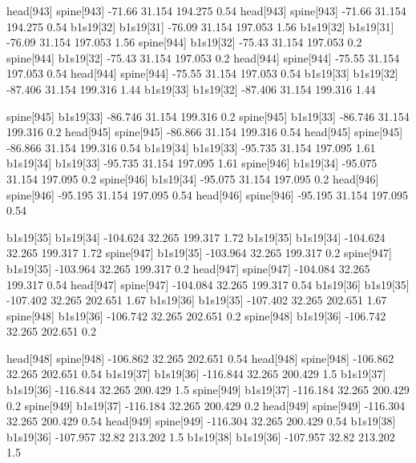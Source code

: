 head[943]    spine[943]    -71.66    31.154    194.275    0.54
head[943]    spine[943]    -71.66    31.154    194.275    0.54
b1s19[32]    b1s19[31]    -76.09    31.154    197.053    1.56
b1s19[32]    b1s19[31]    -76.09    31.154    197.053    1.56
spine[944]    b1s19[32]    -75.43    31.154    197.053    0.2
spine[944]    b1s19[32]    -75.43    31.154    197.053    0.2
head[944]    spine[944]    -75.55    31.154    197.053    0.54
head[944]    spine[944]    -75.55    31.154    197.053    0.54
b1s19[33]    b1s19[32]    -87.406    31.154    199.316    1.44
b1s19[33]    b1s19[32]    -87.406    31.154    199.316    1.44


spine[945]    b1s19[33]    -86.746    31.154    199.316    0.2
spine[945]    b1s19[33]    -86.746    31.154    199.316    0.2
head[945]    spine[945]    -86.866    31.154    199.316    0.54
head[945]    spine[945]    -86.866    31.154    199.316    0.54
b1s19[34]    b1s19[33]    -95.735    31.154    197.095    1.61
b1s19[34]    b1s19[33]    -95.735    31.154    197.095    1.61
spine[946]    b1s19[34]    -95.075    31.154    197.095    0.2
spine[946]    b1s19[34]    -95.075    31.154    197.095    0.2
head[946]    spine[946]    -95.195    31.154    197.095    0.54
head[946]    spine[946]    -95.195    31.154    197.095    0.54


b1s19[35]    b1s19[34]    -104.624    32.265    199.317    1.72
b1s19[35]    b1s19[34]    -104.624    32.265    199.317    1.72
spine[947]    b1s19[35]    -103.964    32.265    199.317    0.2
spine[947]    b1s19[35]    -103.964    32.265    199.317    0.2
head[947]    spine[947]    -104.084    32.265    199.317    0.54
head[947]    spine[947]    -104.084    32.265    199.317    0.54
b1s19[36]    b1s19[35]    -107.402    32.265    202.651    1.67
b1s19[36]    b1s19[35]    -107.402    32.265    202.651    1.67
spine[948]    b1s19[36]    -106.742    32.265    202.651    0.2
spine[948]    b1s19[36]    -106.742    32.265    202.651    0.2


head[948]    spine[948]    -106.862    32.265    202.651    0.54
head[948]    spine[948]    -106.862    32.265    202.651    0.54
b1s19[37]    b1s19[36]    -116.844    32.265    200.429    1.5
b1s19[37]    b1s19[36]    -116.844    32.265    200.429    1.5
spine[949]    b1s19[37]    -116.184    32.265    200.429    0.2
spine[949]    b1s19[37]    -116.184    32.265    200.429    0.2
head[949]    spine[949]    -116.304    32.265    200.429    0.54
head[949]    spine[949]    -116.304    32.265    200.429    0.54
b1s19[38]    b1s19[36]    -107.957    32.82    213.202    1.5
b1s19[38]    b1s19[36]    -107.957    32.82    213.202    1.5


